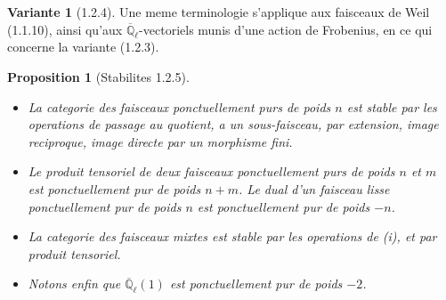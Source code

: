 \documentclass[12pt,a4paper]{article}
\theoremstyle{plain}
\newtheorem{proposition}[theorem]{Proposition}
\theoremstyle{definition}
\newtheorem{var}[theorem]{Variante}
\theoremstyle{definition}
\theoremstyle{remark}
\begin{document}
\begin{var}[1.2.4]
Une meme terminologie s'applique aux faisceaux de Weil (1.1.10), ainsi qu'aux $\overline{\mathbb{Q}}_\ell$-vectoriels munis d'une action de Frobenius, en ce qui concerne la variante (1.2.3).
\end{var}

\begin{proposition}[Stabilites 1.2.5]
$\;$
\begin{itemize}[nosep]
\item[(i)] La categorie des faisceaux ponctuellement purs de poids $n$ est stable par les operations de passage au quotient, a un sous-faisceau, par extension, image reciproque, image directe par un morphisme fini.
\item[(ii)] Le produit tensoriel de deux faisceaux ponctuellement purs de poids $n$ et $m$ est ponctuellement pur de poids $n+m$. Le dual d'un faisceau lisse ponctuellement pur de poids $n$ est ponctuellement pur de poids $-n$.
\item[(iii)] La categorie des faisceaux mixtes est stable par les operations de (i), et par produit tensoriel.
\item[(iv)] Notons enfin que $\overline{\mathbb{Q}}_\ell(1)$ est ponctuellement pur de poids $-2$.
\end{itemize}
\end{proposition}
\end{document}

